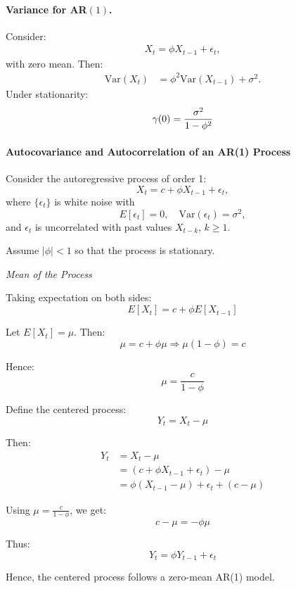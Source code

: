 \documentclass[10pt,a4paper]{article}
\begin{document}
	
	\paragraph{Variance for AR$(1)$.} Consider:
	\begin{align*}
	X_t = \phi X_{t-1} + \epsilon_t,
	\end{align*}
	with zero mean. Then:
	\begin{align*}
	\text{Var}(X_t) &= \phi^2 \text{Var}(X_{t-1}) + \sigma^2.
	\end{align*}
	Under stationarity:
	\begin{align*}
	\large \gamma(0) = \frac{\sigma^2}{1 - \phi^2}
	\end{align*}
	
	\paragraph{Autocovariance and Autocorrelation of an AR(1) Process}
	
	
	Consider the autoregressive process of order 1:
	\[
	X_t = c + \phi X_{t-1} + \epsilon_t,
	\]
	where \(\{\epsilon_t\}\) is white noise with
	\[
	E[\epsilon_t] = 0, \quad \mathrm{Var}(\epsilon_t) = \sigma^2,
	\]
	and \(\epsilon_t\) is uncorrelated with past values \(X_{t-k}\), \(k \geq 1\).
	
	Assume \(|\phi| < 1\) so that the process is stationary.
	
	\textit{Mean of the Process}
	
	Taking expectation on both sides:
	\[
	E[X_t] = c + \phi E[X_{t-1}]
	\]
	
	Let \(E[X_t] = \mu\). Then:
	\[
	\mu = c + \phi \mu
	\Rightarrow \mu(1 - \phi) = c
	\]
	
	Hence:
	\[
	\mu = \frac{c}{1 - \phi}
	\]
	
	
	
	Define the centered process:
	\[
	Y_t = X_t - \mu
	\]
	
	Then:
	\begin{align*}
	Y_t &= X_t - \mu \\
	    &= (c + \phi X_{t-1} + \epsilon_t) - \mu \\
	    &= \phi (X_{t-1} - \mu) + \epsilon_t + (c - \mu)
	\end{align*}
	
	Using \(\mu = \frac{c}{1 - \phi}\), we get:
	\[
	c - \mu = -\phi \mu
	\]
	
	Thus:
	\[
	Y_t = \phi Y_{t-1} + \epsilon_t
	\]
	
	Hence, the centered process follows a zero-mean AR(1) model.
	
\end{document}
